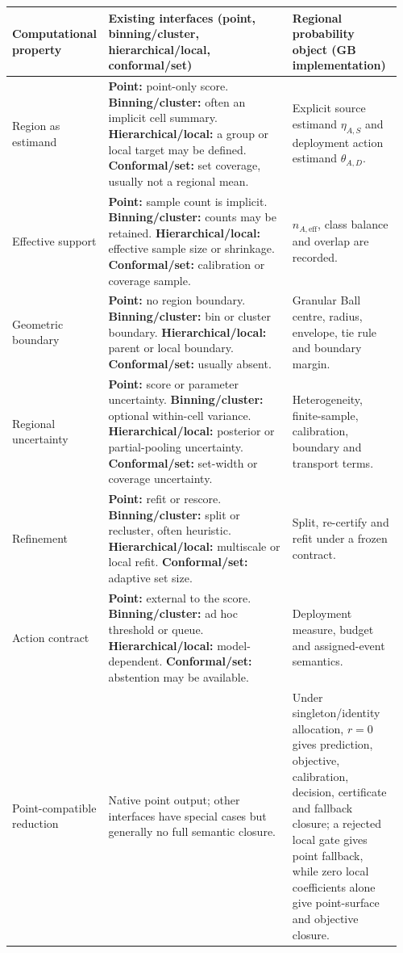 \documentclass[10pt]{article}
\begin{document}
\begin{table}[H]
\centering
\small
\setlength{\tabcolsep}{3.5pt}
\renewcommand{\arraystretch}{1.16}
\begin{tabular}{@{}L{0.20\linewidth}L{0.47\linewidth}L{0.29\linewidth}@{}}
\toprule
Computational property & Existing interfaces (point, binning/cluster, hierarchical/local, conformal/set) & Regional probability object (GB implementation) \\
\midrule
Region as estimand & \textbf{Point:} point-only score. \textbf{Binning/cluster:} often an implicit cell summary. \textbf{Hierarchical/local:} a group or local target may be defined. \textbf{Conformal/set:} set coverage, usually not a regional mean. & Explicit source estimand $\eta_{A,S}$ and deployment action estimand $\theta_{A,D}$. \\
Effective support & \textbf{Point:} sample count is implicit. \textbf{Binning/cluster:} counts may be retained. \textbf{Hierarchical/local:} effective sample size or shrinkage. \textbf{Conformal/set:} calibration or coverage sample. & $n_{A,\mathrm{eff}}$, class balance and overlap are recorded. \\
Geometric boundary & \textbf{Point:} no region boundary. \textbf{Binning/cluster:} bin or cluster boundary. \textbf{Hierarchical/local:} parent or local boundary. \textbf{Conformal/set:} usually absent. & Granular Ball centre, radius, envelope, tie rule and boundary margin. \\
Regional uncertainty & \textbf{Point:} score or parameter uncertainty. \textbf{Binning/cluster:} optional within-cell variance. \textbf{Hierarchical/local:} posterior or partial-pooling uncertainty. \textbf{Conformal/set:} set-width or coverage uncertainty. & Heterogeneity, finite-sample, calibration, boundary and transport terms. \\
Refinement & \textbf{Point:} refit or rescore. \textbf{Binning/cluster:} split or recluster, often heuristic. \textbf{Hierarchical/local:} multiscale or local refit. \textbf{Conformal/set:} adaptive set size. & Split, re-certify and refit under a frozen contract. \\
Action contract & \textbf{Point:} external to the score. \textbf{Binning/cluster:} ad hoc threshold or queue. \textbf{Hierarchical/local:} model-dependent. \textbf{Conformal/set:} abstention may be available. & Deployment measure, budget and assigned-event semantics. \\
Point-compatible reduction & Native point output; other interfaces have special cases but generally no full semantic closure. & Under singleton/identity allocation, $r=0$ gives prediction, objective, calibration, decision, certificate and fallback closure; a rejected local gate gives point fallback, while zero local coefficients alone give point-surface and objective closure. \\

\end{tabular}
\end{table}
\end{document}
